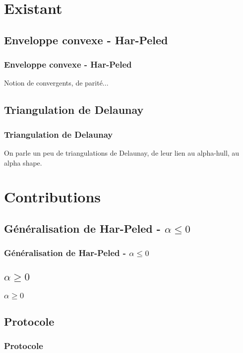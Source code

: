 \documentclass{beamer}
\begin{document}
\section{Existant}

\subsection{Enveloppe convexe - Har-Peled}
\begin{frame}
\frametitle{Enveloppe convexe - Har-Peled}
Notion de convergents, de parité...
\end{frame}

\subsection{Triangulation de Delaunay}  %
\begin{frame}
\frametitle{Triangulation de Delaunay}
On parle un peu de triangulations de Delaunay, de leur lien au alpha-hull, au alpha shape.
\end{frame}

\section{Contributions}

\subsection{Généralisation de Har-Peled - $\alpha \leq 0$}
\begin{frame}
\frametitle{Généralisation de Har-Peled - $\alpha \leq 0$}

\end{frame}

\subsection{$\alpha \geq 0$}
\begin{frame}
\frametitle{$\alpha \geq 0$}
\end{frame}

\subsection{Protocole}
\begin{frame}
\frametitle{Protocole}
\end{frame}
\end{document}
